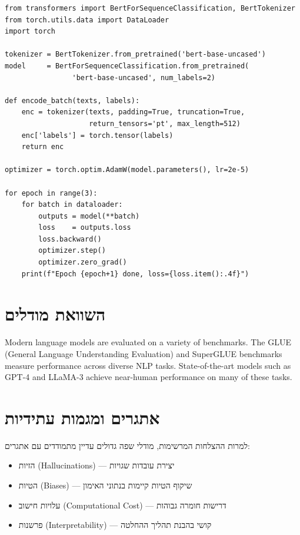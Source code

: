\begin{LTR}
\begin{verbatim}
from transformers import BertForSequenceClassification, BertTokenizer
from torch.utils.data import DataLoader
import torch

tokenizer = BertTokenizer.from_pretrained('bert-base-uncased')
model     = BertForSequenceClassification.from_pretrained(
                'bert-base-uncased', num_labels=2)

def encode_batch(texts, labels):
    enc = tokenizer(texts, padding=True, truncation=True,
                    return_tensors='pt', max_length=512)
    enc['labels'] = torch.tensor(labels)
    return enc

optimizer = torch.optim.AdamW(model.parameters(), lr=2e-5)

for epoch in range(3):
    for batch in dataloader:
        outputs = model(**batch)
        loss    = outputs.loss
        loss.backward()
        optimizer.step()
        optimizer.zero_grad()
    print(f"Epoch {epoch+1} done, loss={loss.item():.4f}")
\end{verbatim}
\end{LTR}

\section{השוואת מודלים}

\begin{english}
Modern language models are evaluated on a variety of benchmarks. The
\textenglish{GLUE} (\textenglish{General Language Understanding Evaluation}) and
\textenglish{SuperGLUE} benchmarks measure performance across diverse NLP tasks.
State-of-the-art models such as \textenglish{GPT-4} and \textenglish{LLaMA-3}
achieve near-human performance on many of these tasks.
\end{english}

\section{אתגרים ומגמות עתידיות}

למרות ההצלחות המרשימות, מודלי שפה גדולים עדיין מתמודדים עם אתגרים:

\begin{itemize}
    \item הזיות (\textenglish{Hallucinations}) — יצירת עובדות שגויות
    \item הטיות (\textenglish{Biases}) — שיקוף הטיות קיימות בנתוני האימון
    \item עלויות חישוב (\textenglish{Computational Cost}) — דרישות חומרה גבוהות
    \item פרשנות (\textenglish{Interpretability}) — קושי בהבנת תהליך ההחלטה
\end{itemize}

